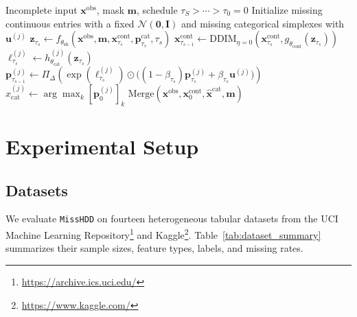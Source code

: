 \documentclass[times, review, 10pt]{elsarticle}
\newcommand{\algsmall}{\footnotesize}
\begin{document}
\begin{algorithm}[t]
\caption{MissHDD deterministic inference}
\label{alg:inference}
\algsmall
\begin{algorithmic}[1]
\Require Incomplete input $\mathbf{x}^{\mathrm{obs}}$, mask $\mathbf{m}$, schedule $\tau_S>\cdots>\tau_0=0$
\State Initialize missing continuous entries with a fixed $\mathcal{N}(\mathbf{0},\mathbf{I})$ and missing categorical simplexes with $\mathbf{u}^{(j)}$
    \State $\mathbf{z}_{\tau_s}\gets f_{\theta_{\mathrm{sh}}}(\mathbf{x}^{\mathrm{obs}},\mathbf{m},
    \mathbf{x}^{\mathrm{cont}}_{\tau_s},\mathbf{p}^{\mathrm{cat}}_{\tau_s},\tau_s)$
    \State $\mathbf{x}^{\mathrm{cont}}_{\tau_{s-1}}\gets
    \mathrm{DDIM}_{\eta=0}(\mathbf{x}^{\mathrm{cont}}_{\tau_s},g_{\theta_{\mathrm{cont}}}(\mathbf{z}_{\tau_s}))$
        \State $\boldsymbol{\ell}^{(j)}_{\tau_s}\gets h_{\theta_{\mathrm{cat}}}^{(j)}(\mathbf{z}_{\tau_s})$
        \State $\mathbf{p}^{(j)}_{\tau_{s-1}}\gets
        \Pi_\Delta\!\left(\exp(\boldsymbol{\ell}^{(j)}_{\tau_s})
        \odot\big((1-\beta_{\tau_s})\mathbf{p}^{(j)}_{\tau_s}+\beta_{\tau_s}\mathbf{u}^{(j)}\big)\right)$
    \EndFor
\EndFor
\State $\hat{x}^{(j)}_{\mathrm{cat}}\gets \arg\max_k[\mathbf{p}^{(j)}_{0}]_k$
\State \Return $\mathrm{Merge}(\mathbf{x}^{\mathrm{obs}},\mathbf{x}^{\mathrm{cont}}_0,\hat{\mathbf{x}}^{\mathrm{cat}},\mathbf{m})$
\end{algorithmic}
\end{algorithm}



\section{Experimental Setup}



\subsection{Datasets}

We evaluate \texttt{MissHDD} on fourteen heterogeneous tabular datasets from
the UCI Machine Learning Repository\footnote{\url{https://archive.ics.uci.edu/}}
and Kaggle\footnote{\url{https://www.kaggle.com/}}. Table~\ref{tab:dataset_summary}
summarizes their sample sizes, feature types, labels, and missing rates.
\end{document}
